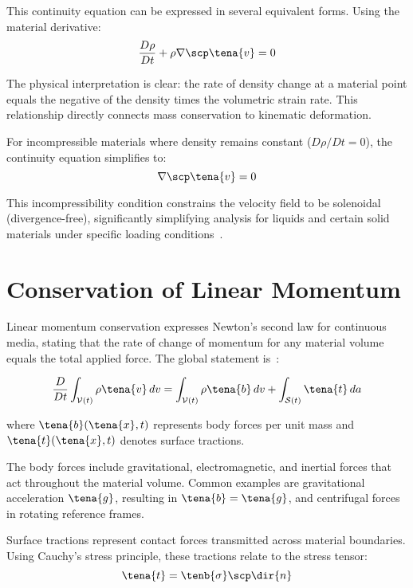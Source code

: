 This continuity equation can be expressed in several equivalent forms. Using the material derivative:
\begin{equation}
\frac{D\rho}{Dt} + \rho \nabla \scp \tena{v} = 0
\end{equation}

The physical interpretation is clear: the rate of density change at a material point equals the negative of the density times the volumetric strain rate. This relationship directly connects mass conservation to kinematic deformation.

For incompressible materials where density remains constant ($D\rho/Dt = 0$), the continuity equation simplifies to:
\begin{equation}
\nabla \scp \tena{v} = 0
\end{equation}

This incompressibility condition constrains the velocity field to be solenoidal (divergence-free), significantly simplifying analysis for liquids and certain solid materials under specific loading conditions~\autocite{Sadd.2019}.

\section{Conservation of Linear Momentum}

Linear momentum conservation expresses Newton's second law for continuous media, stating that the rate of change of momentum for any material volume equals the total applied force. The global statement is~\autocite{Sadd.2019}:

\begin{equation}
\frac{D}{Dt}\int_{\mathcal{V}(t)} \rho \tena{v} \, dv = \int_{\mathcal{V}(t)} \rho \tena{b} \, dv + \int_{\mathcal{S}(t)} \tena{t} \, da
\end{equation}

where $\tena{b}(\tena{x}, t)$ represents body forces per unit mass and $\tena{t}(\tena{x}, t)$ denotes surface tractions.

The body forces include gravitational, electromagnetic, and inertial forces that act throughout the material volume. Common examples are gravitational acceleration $\tena{g}$, resulting in $\tena{b} = \tena{g}$, and centrifugal forces in rotating reference frames.

Surface tractions represent contact forces transmitted across material boundaries. Using Cauchy's stress principle, these tractions relate to the stress tensor:
\begin{equation}
\tena{t} = \tenb{\sigma} \scp \dir{n}
\end{equation}

